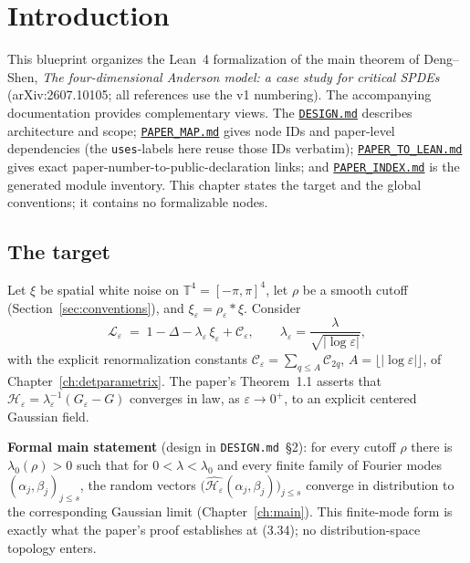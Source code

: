 \chapter{Introduction}

This blueprint organizes the Lean~4 formalization of the main theorem of
Deng--Shen, \emph{The four-dimensional Anderson model: a case study for
critical SPDEs} (arXiv:2607.10105; all references use the v1 numbering).
The accompanying documentation provides complementary views.  The
\href{https://github.com/sairmath/anderson4d_lean/blob/main/docs/DESIGN.md}
{\texttt{DESIGN.md}} describes architecture and scope;
\href{https://github.com/sairmath/anderson4d_lean/blob/main/docs/PAPER_MAP.md}
{\texttt{PAPER\_MAP.md}} gives node IDs and paper-level dependencies (the
\texttt{uses}-labels here reuse those IDs verbatim);
\href{https://github.com/sairmath/anderson4d_lean/blob/main/docs/PAPER_TO_LEAN.md}
{\texttt{PAPER\_TO\_LEAN.md}} gives exact paper-number-to-public-declaration
links; and
\href{https://github.com/sairmath/anderson4d_lean/blob/main/docs/PAPER_INDEX.md}
{\texttt{PAPER\_INDEX.md}} is the generated module inventory.  This chapter
states the target and the global conventions; it contains no formalizable nodes.

\section{The target}

Let \(\xi\) be spatial white noise on \(\mathbb{T}^4 = [-\pi,\pi]^4\), let
\(\rho\) be a smooth cutoff (Section~\ref{sec:conventions}), and
\(\xi_\varepsilon = \rho_\varepsilon * \xi\). Consider
\[
\mathcal{L}_\varepsilon \;=\; 1 - \Delta - \lambda_\varepsilon\,\xi_\varepsilon
  + \mathcal{C}_\varepsilon,
\qquad \lambda_\varepsilon = \frac{\lambda}{\sqrt{\lvert\log\varepsilon\rvert}},
\]
with the explicit renormalization constants
\(\mathcal{C}_\varepsilon = \sum_{q \le A}\mathcal{C}_{2q}\),
\(A = \lfloor\lvert\log\varepsilon\rvert\rfloor\), of
Chapter~\ref{ch:detparametrix}. The paper's Theorem~1.1 asserts that
\(\mathcal{H}_\varepsilon = \lambda_\varepsilon^{-1}(G_\varepsilon - G)\) converges in
law, as \(\varepsilon \to 0^+\), to an explicit centered Gaussian field.

\textbf{Formal main statement} (design in \texttt{DESIGN.md}~\S2): for every
cutoff \(\rho\) there is \(\lambda_0(\rho) > 0\) such that for
\(0 < \lambda < \lambda_0\) and every finite family of Fourier modes
\((\alpha_j,\beta_j)_{j\le s}\), the random vectors
\(\big(\widehat{\mathcal{H}_\varepsilon}(\alpha_j,\beta_j)\big)_{j\le s}\)
converge in distribution to the corresponding Gaussian limit
(Chapter~\ref{ch:main}). This finite-mode form is exactly what the paper's
proof establishes at (3.34); no distribution-space topology enters.

